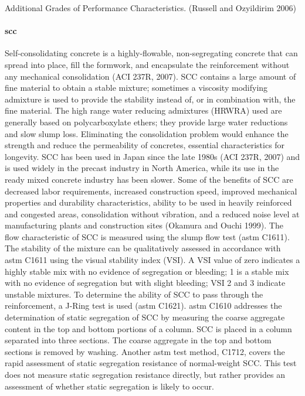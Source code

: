 \begin{table}
  \caption{Additional Grades of Performance Characteristics. (Russell and Ozyildirim 2006)}\label{tab:additional-grade}
\end{table}

\paragraph{\acrfull*{scc}}
Self-consolidating concrete is a highly-flowable, non-segregating concrete that can spread into place, fill the formwork, and encapsulate the reinforcement without any mechanical consolidation (ACI 237R, 2007). SCC contains a large amount of fine material to obtain a stable mixture; sometimes a viscosity modifying admixture is used to provide the stability instead of, or in combination with, the fine material. The high range water reducing admixtures (HRWRA) used are generally based on polycarboxylate ethers; they provide large water reductions and slow slump loss. Eliminating the consolidation problem would enhance the strength and reduce the permeability of concretes, essential characteristics for longevity. SCC has been used in Japan since the late 1980s (ACI 237R, 2007) and is used widely in the precast industry in North America, while its use in the ready mixed concrete industry has been slower. Some of the benefits of SCC are decreased labor requirements, increased construction speed, improved mechanical properties and durability characteristics, ability to be used in heavily reinforced and congested areas, consolidation without vibration, and a reduced noise level at manufacturing plants and construction sites (Okamura and Ouchi 1999). The flow characteristic of SCC is measured using the slump flow test (\acrshort*{astm} C1611). The stability of the mixture can be qualitatively assessed in accordance with \acrshort*{astm} C1611 using the visual stability index (VSI). A VSI value of zero indicates a highly stable mix with no evidence of segregation or bleeding; 1 is a stable mix with no evidence of segregation but with slight bleeding; VSI 2 and 3 indicate unstable mixtures. To determine the ability of SCC to pass through the reinforcement, a J-Ring test is used (\acrshort*{astm} C1621). \acrshort*{astm} C1610 addresses the determination of static segregation of SCC by measuring the coarse aggregate content in the top and bottom portions of a column. SCC is placed in a column separated into three sections. The coarse aggregate in the top and bottom sections is removed by washing. Another \acrshort*{astm} test method, C1712, covers the rapid assessment of static segregation resistance of normal-weight SCC. This test does not measure static segregation resistance directly, but rather provides an assessment of whether static segregation is likely to occur.

